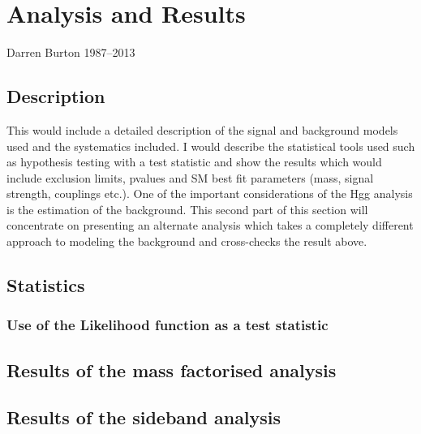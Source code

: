 \chapter{Analysis and Results}
\label{chap:results}
{Darren Burton 1987--2013}

\section{Description}

This would include a detailed description of the signal and background models used and the systematics included. I would describe the statistical tools used such as hypothesis testing with a test statistic and show the results which would include exclusion limits, pvalues and SM best fit parameters (mass, signal strength, couplings etc.). One of the important considerations of the Hgg analysis is the estimation of the background. This second part of this section will concentrate on presenting an alternate analysis which takes a completely different approach to modeling the background and cross-checks the result above.

\section{Statistics}
\subsection{Use of the Likelihood function as a test statistic}

\section{Results of the mass factorised analysis}

\section{Results of the sideband analysis}
